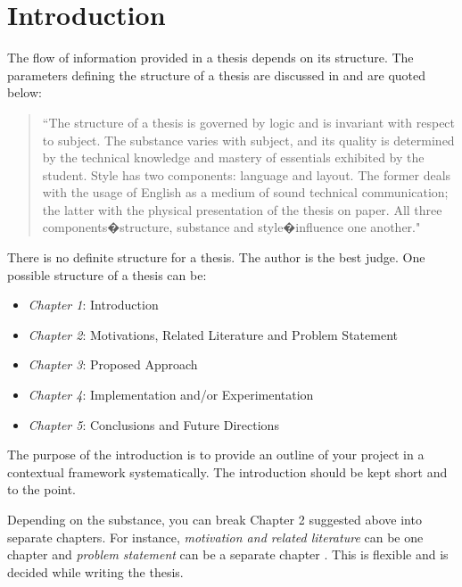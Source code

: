 
\chapter{Introduction} %
\label{Chapter1}



The flow of information provided in a thesis depends on its structure. The parameters defining the structure of a thesis are discussed in \cite{getthesis} and are quoted below:  

\begin{quote}
``The structure of a thesis is governed by logic and is invariant with respect to subject. The substance varies with subject, and its quality is determined by the technical knowledge and mastery of essentials exhibited by the student. Style has two components: language and layout. The former deals with the usage of English as a medium of sound technical communication; the latter with the physical presentation of the thesis on paper. All three components�structure, substance and style�influence one another."
\end{quote}

There is no definite structure for a thesis. The author is the best judge. One possible structure of a thesis can be:

\begin{itemize}
	\item \textit{Chapter 1}: Introduction
	\item \textit{Chapter 2}: Motivations, Related Literature and Problem Statement
	\item \textit{Chapter 3}: Proposed Approach
	\item \textit{Chapter 4}: Implementation and/or Experimentation 
	\item \textit{Chapter 5}: Conclusions and Future Directions 
\end{itemize}

The purpose of the introduction is to provide an outline of your project in a contextual framework systematically. The introduction should be kept short and to the point. 

Depending on the substance, you can break Chapter 2 suggested above into  separate chapters. For instance, \textit{motivation and related literature} can be one chapter and \textit{problem statement} can be a separate chapter . This is flexible and is decided while writing the thesis. 

